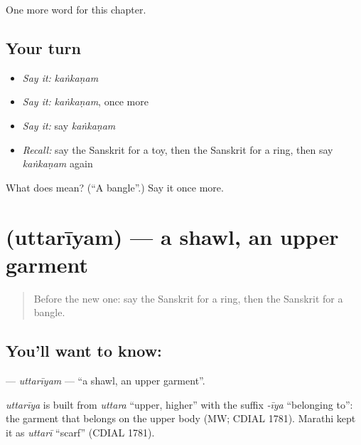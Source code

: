 \begin{grammarlens}[title={What you've built}]
One more word for this chapter.
\end{grammarlens}

\subsection*{Your turn}
\begin{itemize}
\raggedright
  \item \emph{Say it:} \emph{kaṅkaṇam}
  \item \emph{Say it:} \emph{kaṅkaṇam}, once more
  \item \emph{Say it:} say \emph{kaṅkaṇam}
  \item \emph{Recall:} say the Sanskrit for a toy, then the Sanskrit for a ring, then say \emph{kaṅkaṇam} again
\end{itemize}

\begin{tcolorbox}[breakable,colback=teal!4,colframe=teal!35!black,title={Before you move on}]
What does  mean? (\textquotedblleft{}A bangle\textquotedblright{}.) Say it once more.
\end{tcolorbox}
\section[\texorpdfstring{\sk{उत्तरीयम्} (uttarīyam)}{उत्तरीयम् (uttarīyam)}]{ (uttarīyam) — a shawl, an upper garment}

\label{lesson:SA-C103-uttariyam}



\begin{quote}
Before the new one: say the Sanskrit for a ring, then the Sanskrit for a bangle.
\end{quote}

\subsection*{You'll want to know: }
\textbf{} — \emph{uttarīyam} — \textquotedblleft{}a shawl, an upper garment\textquotedblright{}.

\begin{cousinweb}
\emph{uttarīya} is built from \emph{uttara} \textquotedblleft{}upper, higher\textquotedblright{} with the suffix \emph{-īya} \textquotedblleft{}belonging to\textquotedblright{}: the garment that belongs on the upper body (MW; CDIAL 1781). Marathi kept it as \emph{uttarī} \textquotedblleft{}scarf\textquotedblright{} (CDIAL 1781).
\end{cousinweb}

